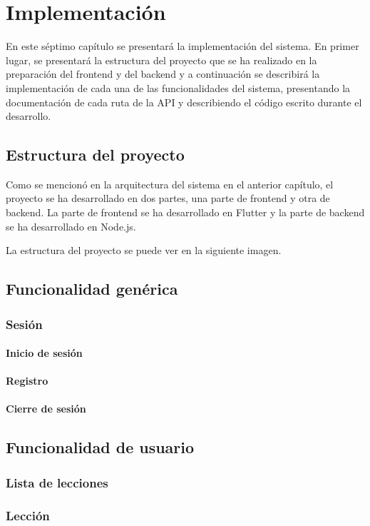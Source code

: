 \chapter{Implementación}
En este séptimo capítulo se presentará la implementación del sistema. En primer lugar, se presentará la estructura del proyecto que se ha realizado en la preparación del frontend y del backend y a continuación
se describirá la implementación de cada una de las funcionalidades del sistema, presentando la documentación de cada ruta de la API y describiendo el código escrito durante el desarrollo.

\section{Estructura del proyecto}
\label{sec:estructura}
Como se mencionó en la arquitectura del sistema en el anterior capítulo, el proyecto se ha desarrollado en dos partes, una parte de frontend y otra de backend. La parte de frontend se ha desarrollado en Flutter y la parte de backend se ha desarrollado en Node.js. 

La estructura del proyecto se puede ver en la siguiente imagen.


\section{Funcionalidad genérica}

\subsection*{Sesión}
\label{sec:sesion}
\subsubsection*{Inicio de sesión}
\subsubsection*{Registro}
\subsubsection*{Cierre de sesión}

\section{Funcionalidad de usuario}

\subsection*{Lista de lecciones}
\label{sec:lista_lecciones}

\subsection*{Lección}
\label{sec:leccion}


